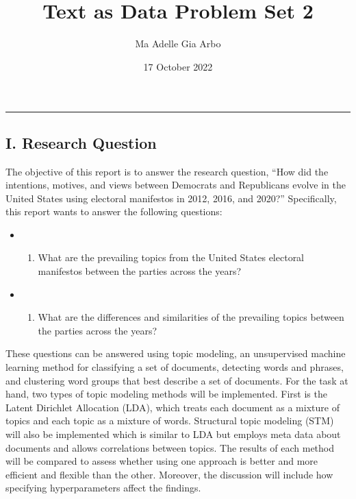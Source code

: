 \documentclass[
]{article}
\title{Text as Data Problem Set 2}
\author{Ma Adelle Gia Arbo}
\date{17 October 2022}
\providecommand{\tightlist}{%
  \setlength{\itemsep}{0pt}\setlength{\parskip}{0pt}}
\begin{document}
\maketitle

{
\setcounter{tocdepth}{3}
\tableofcontents
}
\begin{center}\rule{0.5\linewidth}{0.5pt}\end{center}

\hypertarget{i.-research-question}{%
\subsection{I. Research Question}\label{i.-research-question}}

The objective of this report is to answer the research question, ``How
did the intentions, motives, and views between Democrats and Republicans
evolve in the United States using electoral manifestos in 2012, 2016,
and 2020?'' Specifically, this report wants to answer the following
questions:

\begin{itemize}
\item
  \begin{enumerate}
  \def\labelenumi{\arabic{enumi}.}
  \tightlist
  \item
    What are the prevailing topics from the United States electoral
    manifestos between the parties across the years?
  \end{enumerate}
\item
  \begin{enumerate}
  \def\labelenumi{\arabic{enumi}.}
  \setcounter{enumi}{1}
  \tightlist
  \item
    What are the differences and similarities of the prevailing topics
    between the parties across the years?
  \end{enumerate}
\end{itemize}

These questions can be answered using topic modeling, an unsupervised
machine learning method for classifying a set of documents, detecting
words and phrases, and clustering word groups that best describe a set
of documents. For the task at hand, two types of topic modeling methods
will be implemented. First is the Latent Dirichlet Allocation (LDA),
which treats each document as a mixture of topics and each topic as a
mixture of words. Structural topic modeling (STM) will also be
implemented which is similar to LDA but employs meta data about
documents and allows correlations between topics. The results of each
method will be compared to assess whether using one approach is better
and more efficient and flexible than the other. Moreover, the discussion
will include how specifying hyperparameters affect the findings.
\end{document}
